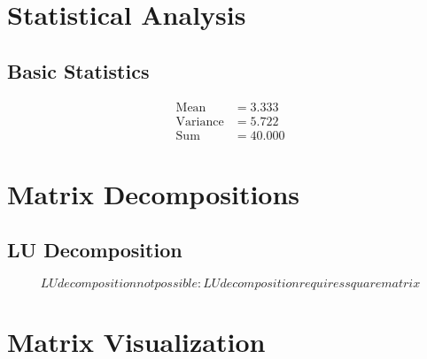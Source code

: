 \documentclass{article}
\begin{document}
\section{Statistical Analysis}
\subsection{Basic Statistics}
\begin{align*}
\text{Mean} &= 3.333\\
\text{Variance} &= 5.722\\
\text{Sum} &= 40.000
\end{align*}

\section{Matrix Decompositions}
\subsection{LU Decomposition}
\[LU
 decomposition not possible: LU decomposition requires square matrix\]

\section{Matrix Visualization}
\end{document}
